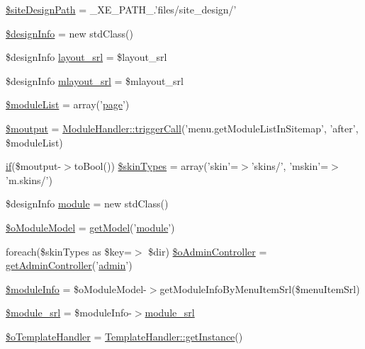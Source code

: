 \begin{DoxyCompactItemize}
\item 
\hyperlink{ko_8install_8php_a0b79a974b91157b79d83cc0be7e3247c}{\$site\+Design\+Path} = \+\_\+\+X\+E\+\_\+\+P\+A\+T\+H\+\_\+.'files/site\+\_\+design/'
\item 
\hyperlink{ko_8install_8php_a99e144f7d563ceb76b003d54739b3b0c}{\$design\+Info} = new std\+Class()
\item 
\$design\+Info \hyperlink{ko_8install_8php_a70054876db09b2519a1726663c8dd9e7}{layout\+\_\+srl} = \$layout\+\_\+srl
\item 
\$design\+Info \hyperlink{ko_8install_8php_a9cf497537007b08c645bed35f564be54}{mlayout\+\_\+srl} = \$mlayout\+\_\+srl
\item 
\hyperlink{ko_8install_8php_aaa80946d50e2d3677fbbc6d6c8a643c3}{\$module\+List} = array('\hyperlink{classpage}{page}')
\item 
\hyperlink{ko_8install_8php_a2598d068355cca17645bc6bd70cc3a8c}{\$moutput} = \hyperlink{classModuleHandler_aa1b1f9eae91ccd76e6a81c9375c2e673}{Module\+Handler\+::trigger\+Call}('menu.\+get\+Module\+List\+In\+Sitemap', 'after', \$module\+List)
\item 
\hyperlink{point__level__icon_8addon_8php_a29031816e50a8f742422e671b2bef9b2}{if}(\$moutput-\/$>$to\+Bool()) \hyperlink{ko_8install_8php_aa61073b7b359568eb3459da113fd8cdf}{\$skin\+Types} = array('skin'=$>$'skins/', 'mskin'=$>$'m.\+skins/')
\item 
\$design\+Info \hyperlink{ko_8install_8php_a5c3fc1968f94c2b6a7c60845f284de78}{module} = new std\+Class()
\item 
\hyperlink{ko_8install_8php_a8d7a87df524e7d6938f66f8e284cdd1e}{\$o\+Module\+Model} = \hyperlink{func_8inc_8php_aecdfcc5332bcf22df01fc21a03b64435}{get\+Model}('\hyperlink{classmodule}{module}')
\item 
foreach(\$skin\+Types as \$key=$>$ \$dir) \hyperlink{ko_8install_8php_a4e2098076e50f24dd86e1062844d25d5}{\$o\+Admin\+Controller} = \hyperlink{func_8inc_8php_a2f7ca88a5226536aca3b2f5682bd7b2d}{get\+Admin\+Controller}('\hyperlink{classadmin}{admin}')
\item 
\hyperlink{ko_8install_8php_ae3552a6dd49f37a50e7858151f7c5cc2}{\$module\+Info} = \$o\+Module\+Model-\/$>$get\+Module\+Info\+By\+Menu\+Item\+Srl(\$menu\+Item\+Srl)
\item 
\hyperlink{ko_8install_8php_ae40aed4d7a99050245e66ca2a82949ed}{\$module\+\_\+srl} = \$module\+Info-\/$>$\hyperlink{ko_8install_8php_a370bb6450fab1da3e0ed9f484a38b761}{module\+\_\+srl}
\item 
\hyperlink{ko_8install_8php_abd57e3ab220291ea9b5c16c2a4e0670e}{\$o\+Template\+Handler} = \hyperlink{classTemplateHandler_a9745460c5daccfc48abf8652778b2718}{Template\+Handler\+::get\+Instance}()

\end{DoxyCompactItemize}
